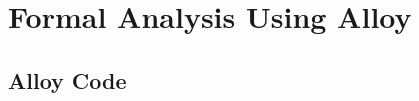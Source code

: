 \section{Formal Analysis Using Alloy}




\def\alloy{\lstinline[
	language=alloy,
	style=alloy,
	basicstyle=\ttfamily\small
]}

\renewcommand{\ttdefault}{pcr}  %
\lstset{
	basicstyle=\ttfamily\large
}

\subsection{Alloy Code}

\clearpage
